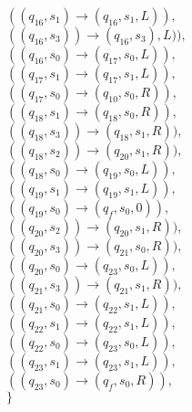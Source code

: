 \documentclass[a4paper]{article} %
\begin{document}
\begin{center}
\begin{varwidth}{\textwidth}
\begin{tasks}[label={},label-width={1cm}]
                \task
                $((q_{16}, s_{1}) \to (q_{16}, s_{1}, L)),$\\
                $((q_{16}, s_{3})) \to (q_{16}, s_{3}), L)),$\\
                $((q_{16}, s_{0}) \to (q_{17}, s_{0}, L)),$\\
                $((q_{17}, s_{1}) \to (q_{17}, s_{1}, L)),$\\
                $((q_{17}, s_{0}) \to (q_{10}, s_{0}, R)),$\\
                $((q_{18}, s_{1}) \to (q_{18}, s_{0}, R)),$\\
                $((q_{18}, s_{3})) \to (q_{18}, s_{1}, R)),$\\
                $((q_{18}, s_{2})) \to (q_{20}, s_{1}, R)),$\\
                $((q_{18}, s_{0}) \to (q_{19}, s_{0}, L)),$\\
                $((q_{19}, s_{1}) \to (q_{19}, s_{1}, L)),$\\
                $((q_{19}, s_{0}) \to (q_{f}, s_{0}, 0)),$\\
                $((q_{20}, s_{2})) \to (q_{20}, s_{1}, R)),$\\
                $((q_{20}, s_{3})) \to (q_{21}, s_{0}, R)),$\\
                $((q_{20}, s_{0}) \to (q_{23}, s_{0}, L)),$\\
                $((q_{21}, s_{3})) \to (q_{21}, s_{1}, R)),$\\
                $((q_{21}, s_{0}) \to (q_{22}, s_{1}, L)),$\\
                $((q_{22}, s_{1}) \to (q_{22}, s_{1}, L)),$\\
                $((q_{22}, s_{0}) \to (q_{23}, s_{0}, L)),$\\
                $((q_{23}, s_{1}) \to (q_{23}, s_{1}, L)),$\\
                $((q_{23}, s_{0}) \to (q_{f}, s_{0}, R)),$\\
                $\}$
            \end{tasks}
            \end{varwidth}
        \end{center}
\end{document}
